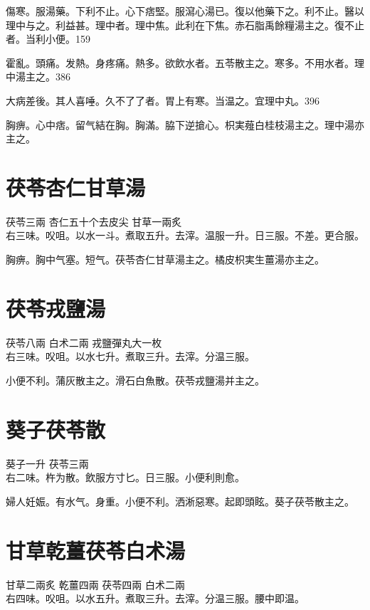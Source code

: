 傷寒。服湯藥。下利不止。心下痞堅。服瀉心湯已。復以他藥下之。利不止。醫以理中与之。利益甚。理中者。理中焦。此利在下焦。赤石脂禹餘糧湯主之。復不止者。当利小便。159

霍亂。頭痛。发熱。身疼痛。熱多。欲飲水者。五苓散主之。寒多。不用水者。理中湯主之。386

大病差後。其人喜唾。久不了了者。胃上有寒。当温之。宜理中丸。396

胸痹。心中痞。留气結在胸。胸滿。脇下逆搶心。枳実薤白桂枝湯主之。理中湯亦主之。

\section{茯苓杏仁甘草湯}

茯苓{\scriptsize 三兩} 杏仁{\scriptsize 五十个去皮尖} 甘草{\scriptsize 一兩炙}\\
右三味。㕮咀。以水一斗。煮取五升。去滓。温服一升。日三服。不差。更合服。

胸痹。胸中气塞。短气。茯苓杏仁甘草湯主之。橘皮枳実生薑湯亦主之。

\section{茯苓戎鹽湯}

茯苓{\scriptsize 八兩} 白术{\scriptsize 二兩} 戎鹽{\scriptsize 彈丸大一枚}\\
右三味。㕮咀。以水七升。煮取三升。去滓。分温三服。

小便不利。蒲灰散主之。滑石白魚散。茯苓戎鹽湯并主之。

\section{葵子茯苓散}

葵子{\scriptsize 一升} 茯苓{\scriptsize 三兩}\\
右二味。杵为散。飲服方寸匕。日三服。小便利則愈。

婦人妊娠。有水气。身重。小便不利。洒淅惡寒。起即頭眩。葵子茯苓散主之。

\section{甘草乾薑茯苓白术湯}

甘草{\scriptsize 二兩炙} 乾薑{\scriptsize 四兩} 茯苓{\scriptsize 四兩} 白术{\scriptsize 二兩}\\
右四味。㕮咀。以水五升。煮取三升。去滓。分温三服。腰中即温。

